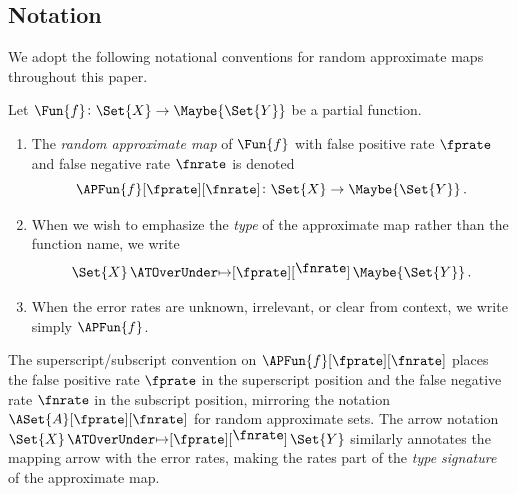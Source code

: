 \documentclass[ ../main.tex]{subfiles}
\begin{document}
\subsection{Notation}
\label{sec:notation}

We adopt the following notational conventions for random approximate maps
throughout this paper.

Let $\Fun{f} \colon \Set{X} \to \Maybe{\Set{Y}}$ be a partial function.
\begin{enumerate}
    \item The \emph{random approximate map} of $\Fun{f}$ with false positive
          rate $\fprate$ and false negative rate $\fnrate$ is denoted
          \begin{equation}
          \label{eq:apfun_notation}
              \APFun{f}[\fprate][\fnrate] \colon \Set{X} \to \Maybe{\Set{Y}}\,.
          \end{equation}
    \item When we wish to emphasize the \emph{type} of the approximate map
          rather than the function name, we write
          \begin{equation}
          \label{eq:arrow_notation}
              \Set{X} \amapsto{\fprate}{\fnrate} \Maybe{\Set{Y}}\,.
          \end{equation}
    \item When the error rates are unknown, irrelevant, or clear from context,
          we write simply $\APFun{f}$.
\end{enumerate}

\begin{remark}
The superscript/subscript convention on $\APFun{f}[\fprate][\fnrate]$ places
the false positive rate $\fprate$ in the superscript position and the false negative rate $\fnrate$ in the subscript position,
mirroring the notation $\ASet{A}[\fprate][\fnrate]$ for random approximate sets.
The arrow notation $\Set{X} \amapsto{\fprate}{\fnrate} \Set{Y}$ similarly
annotates the mapping arrow with the error rates, making the rates part of the
\emph{type signature} of the approximate map.
\end{remark}
\end{document}
